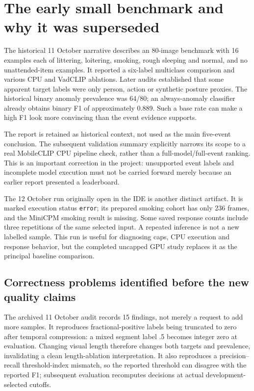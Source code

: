 \section{The early small benchmark and why it was superseded}
The historical 11 October narrative describes an 80-image benchmark with 16 examples each of littering, loitering, smoking, rough sleeping and normal, and no unattended-item examples. It reported a six-label multiclass comparison and various CPU and VadCLIP ablations. Later audits established that some apparent target labels were only person, action or synthetic posture proxies. The historical binary anomaly prevalence was 64/80; an always-anomaly classifier already obtains binary F1 of approximately 0.889. Such a base rate can make a high F1 look more convincing than the event evidence supports.

The report is retained as historical context, not used as the main five-event conclusion. The subsequent validation summary explicitly narrows its scope to a real MobileCLIP CPU pipeline check, rather than a full-model/full-event ranking. This is an important correction in the project: unsupported event labels and incomplete model execution must not be carried forward merely because an earlier report presented a leaderboard.

The 12 October run originally open in the IDE is another distinct artifact. It is marked execution status \texttt{error}; its prepared smoking cohort has only 236 frames, and the MiniCPM smoking result is missing. Some saved response counts include three repetitions of the same selected input. A repeated inference is not a new labelled sample. This run is useful for diagnosing caps, CPU execution and response behavior, but the completed uncapped GPU study replaces it as the principal baseline comparison.

\subsection{Correctness problems identified before the new quality claims}
The archived 11 October audit records 15 findings, not merely a request to add more samples. It reproduces fractional-positive labels being truncated to zero after temporal compression: a mixed segment label .5 becomes integer zero at evaluation. Changing visual length therefore changes both targets and prevalence, invalidating a clean length-ablation interpretation. It also reproduces a precision--recall threshold-index mismatch, so the reported threshold can disagree with the reported F1; subsequent evaluation recomputes decisions at actual development-selected cutoffs.

